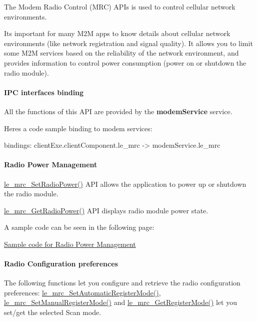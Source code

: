 The Modem Radio Control (M\+RC) A\+P\+Is is used to control cellular network environments.

It\textquotesingle{}s important for many M2M apps to know details about cellular network environments (like network registration and signal quality). It allows you to limit some M2M services based on the reliability of the network environment, and provides information to control power consumption (power on or shutdown the radio module).\hypertarget{c_mrc_le_mrc_binding}{}\paragraph{I\+P\+C interfaces binding}\label{c_mrc_le_mrc_binding}
All the functions of this A\+PI are provided by the {\bfseries modem\+Service} service.

Here\textquotesingle{}s a code sample binding to modem services\+: \begin{DoxyVerb}bindings:
{
   clientExe.clientComponent.le_mrc -> modemService.le_mrc
}
\end{DoxyVerb}
\hypertarget{c_mrc_le_mrc_power}{}\paragraph{Radio Power Management}\label{c_mrc_le_mrc_power}
\hyperlink{le__mrc__interface_8h_a78bd27d92337e2122320f41bcaa5480f}{le\+\_\+mrc\+\_\+\+Set\+Radio\+Power()} A\+PI allows the application to power up or shutdown the radio module.

\hyperlink{le__mrc__interface_8h_aac51332c6c84e460746eb1ad45c064d6}{le\+\_\+mrc\+\_\+\+Get\+Radio\+Power()} A\+PI displays radio module power state.

A sample code can be seen in the following page\+:
\begin{DoxyItemize}
\item \hyperlink{c_mrcRadioPower}{Sample code for Radio Power Management}
\end{DoxyItemize}\hypertarget{c_mrc_le_mrc_configuration}{}\paragraph{Radio Configuration preferences}\label{c_mrc_le_mrc_configuration}
The following functions let you configure and retrieve the radio configuration preferences\+: \hyperlink{le__mrc__interface_8h_acb434a9f91afb5b6639baf3678ee9388}{le\+\_\+mrc\+\_\+\+Set\+Automatic\+Register\+Mode()}, \hyperlink{le__mrc__interface_8h_ac694b8aa7543eb9f058e77a844a5c0bf}{le\+\_\+mrc\+\_\+\+Set\+Manual\+Register\+Mode()} and \hyperlink{le__mrc__interface_8h_a9ad2729c28e97ae450f7aee0865197f6}{le\+\_\+mrc\+\_\+\+Get\+Register\+Mode()} let you set/get the selected Scan mode.

